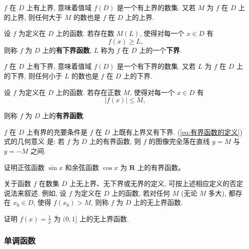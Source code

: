 \documentclass[lang=cn,newtx,10pt,scheme=chinese]{elegantbook}
\begin{document}
$f$ 在 $D$ 上有上界, 意味着值域 $f(D)$ 是一个有上界的数集. 又若 $M$ 为 $f$ 在 $D$ 上的上界, 则任何大于 $M$ 的数也是 $f$ 在 $D$ 上的上界.

\begin{definition}[有下界函数]
    设 $f$ 为定义在 $D$ 上的函数. 若存在数 $M(L)$, 使得对每一个 $x \in D$ 有
    $$
    f(x) \geqslant L,
    $$
    则称 $f$ 为 $D$ 上的\textcolor{third}{\bf 有下界函数}, $L$ 称为 $f$ 在 $D$ 上的一个\textcolor{third}{\bf 下界}.
\end{definition}

$f$ 在 $D$ 上有下界, 意味着值域 $f(D)$ 是一个有下界的数集. 又若 $L$ 为 $f$ 在 $D$ 上的下界, 则任何小于 $L$ 的数也是 $f$ 在 $D$ 上的下界.

\begin{definition}[有界函数]
    设 $f$ 为定义在 $D$ 上的函数. 若存在正数 $M$, 使得对每一个 $x \in D$ 有
    \begin{equation}
    \mid f(x)\mid \leqslant M \text {, }
    \label{eq:有界函数的定义}
    \end{equation}
    
    则称 $f$ 为 $D$ 上的\textcolor{third}{\bf 有界函数}.
\end{definition}

$f$ 在 $D$ 上有界的充要条件是 $f$ 在 $D$ 上既有上界又有下界. (\ref{eq:有界函数的定义})式的几何意义 是: 若 $f$ 为 $D$ 上的有界函数, 则 $f$ 的图像完全落在直线 $y=M$ 与 $y=-M$ 之间.

\vspace{0.5cm}
\begin{exercise}
    证明正弦函数 $\sin x$ 和余弦函数 $\cos x$ 为 $\mathbf{R}$ 上的有界函数。
\end{exercise}
\vspace{0.5cm}

关于函数 $f$ 在数集 $D$ 上无上界、无下界或无界的定义, 可按上述相应定义的否定说法来叙述. 例如, 设 $f$ 为定义在 $D$ 上的函数, 若对任何 $M$ (无论 $M$ 多大), 都存在 $x_0 \in D$, 使得 $f\left(x_0\right)>M$, 则称 $f$ 为 $D$ 上的无上界函数.

\vspace{0.5cm}
\begin{exercise}
    证明 $f(x)=\frac{1}{x}$ 为 $(0,1]$ 上的无上界函数.
\end{exercise}
\vspace{0.5cm}

\subsubsection{单调函数}
\end{document}
